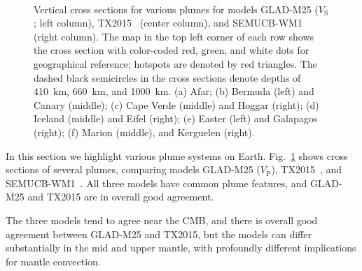\begin{figure}[ht!]
    \\
    \caption{\small{Vertical cross sections for various plumes for models GLAD-M25 ($V_\textrm{S}$; left column), TX2015~\cite{TX2015} (center column), and SEMUCB-WM1~\cite{french2015broad} (right column).
    The map in the top left corner of each row shows the cross section with color-coded red, green, and white dots for geographical reference;
    hotspots are denoted by red triangles.
    The dashed black semicircles in the cross sections denote depths of 410~km, 660~km, and 1000~km.
    (a) Afar; (b) Bermuda (left) and Canary (middle); (c) Cape Verde (middle) and Hoggar (right); (d) Iceland (middle) and Eifel (right); (e) Easter (left) and Galapagos (right); (f) Marion (middle), and Kerguelen (right). }}
    \label{fig:plumes}
\end{figure}

In this section we highlight various plume systems on Earth. Fig.~\ref{fig:plumes}
shows cross sections of several plumes, comparing models GLAD-M25 ($V_\textrm{P}$),
TX2015~\cite{TX2015}, and SEMUCB-WM1~\cite{french2015broad}.
All three models have common plume features,
and GLAD-M25 and TX2015 are in overall good agreement.  

The three models tend to agree near the CMB,
and there is overall good agreement between GLAD-M25 and TX2015,
but the models can differ substantially in the mid and upper mantle,
with profoundly different implications for mantle
convection.


